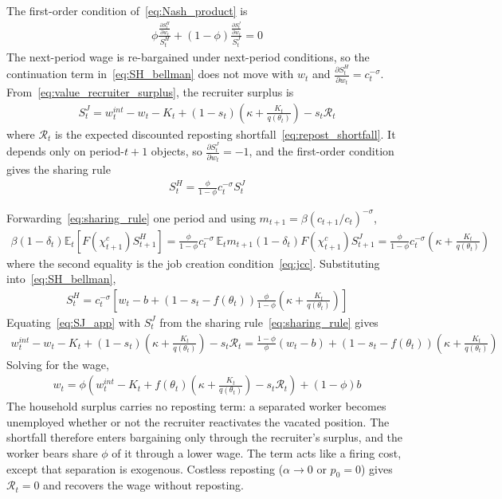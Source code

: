 \documentclass[authoryear, review, 12pt]{elsarticle}
\newcommand{\der}[2]{\frac{\partial #1}{\partial #2}}
\begin{document}
	The first-order condition of~\eqref{eq:Nash_product} is
	\begin{align}
		\phi \frac{\der{S_t^H}{w_t}}{S_t^H}+(1-\phi)\frac{\der{S_t^J}{w_t}}{S_t^J}=0
	\end{align}
	The next-period wage is re-bargained under next-period conditions, so the continuation term in~\eqref{eq:SH_bellman} does not move with $w_t$ and $\der{S_t^H}{w_t}=c_t^{-\sigma}$. From~\eqref{eq:value_recruiter_surplus}, the recruiter surplus is
	\begin{align}\label{eq:SJ_app}
		S_t^J=w_t^{int}-w_t-K_t +(1-s_t)\left(\kappa+\frac{K_t}{q(\theta_t)}\right)-s_t\mathcal{R}_t
	\end{align}
	where $\mathcal{R}_t$ is the expected discounted reposting shortfall~\eqref{eq:repost_shortfall}. It depends only on period-$t+1$ objects, so $\der{S_t^J}{w_t}=-1$, and the first-order condition gives the sharing rule
	\begin{align}\label{eq:sharing_rule}
		S_t^H=\frac{\phi}{1-\phi}c_t^{-\sigma}S_t^J
	\end{align}

	Forwarding~\eqref{eq:sharing_rule} one period and using $m_{t+1}=\beta(c_{t+1}/c_t)^{-\sigma}$,
	\begin{align}
		\beta(1-\delta_t)\mathbb{E}_t\left[F(\chi_{t+1}^c)S_{t+1}^H\right]
		=\frac{\phi}{1-\phi}c_t^{-\sigma}\,\mathbb{E}_tm_{t+1}(1-\delta_t)F(\chi_{t+1}^c)S_{t+1}^J
		=\frac{\phi}{1-\phi}c_t^{-\sigma}\left(\kappa+\frac{K_t}{q(\theta_t)}\right)
	\end{align}
	where the second equality is the job creation condition~\eqref{eq:jcc}. Substituting into~\eqref{eq:SH_bellman},
	\begin{align}
		S_t^H=c_t^{-\sigma}\left[w_t-b+\left(1-s_t-f(\theta_t)\right)\frac{\phi}{1-\phi}\left(\kappa+\frac{K_t}{q(\theta_t)}\right)\right]
	\end{align}
	Equating~\eqref{eq:SJ_app} with $S_t^J$ from the sharing rule~\eqref{eq:sharing_rule} gives
	\begin{align}
		w_t^{int}-w_t-K_t+(1-s_t)\left(\kappa+\frac{K_t}{q(\theta_t)}\right)-s_t\mathcal{R}_t=\frac{1-\phi}{\phi}\left(w_t-b\right)+\left(1-s_t-f(\theta_t)\right)\left(\kappa+\frac{K_t}{q(\theta_t)}\right)
	\end{align}
	Solving for the wage,
	\begin{align}
		w_t=\phi\left(w_t^{int}-K_t+f(\theta_t)\left(\kappa+\frac{K_t}{q(\theta_t)}\right)-s_t\mathcal{R}_t\right)+(1-\phi)b
	\end{align}
	The household surplus carries no reposting term: a separated worker becomes unemployed whether or not the recruiter reactivates the vacated position. The shortfall therefore enters bargaining only through the recruiter's surplus, and the worker bears share $\phi$ of it through a lower wage. The term acts like a firing cost, except that separation is exogenous. Costless reposting ($\alpha\to0$ or $p_0=0$) gives $\mathcal{R}_t=0$ and recovers the wage without reposting.
\end{document}
